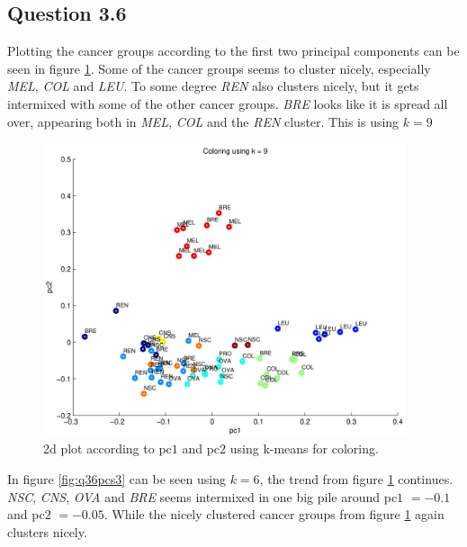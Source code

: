\subsection*{Question 3.6}

Plotting the cancer groups according to the first two principal
components can be seen in figure \ref{fig:q36pcs2}. Some of the cancer
groups seems to cluster nicely, especially \emph{MEL}, \emph{COL} and
\emph{LEU}. To some degree \emph{REN} also clusters nicely, but it
gets intermixed with some of the other cancer groups. \emph{BRE} looks
like it is spread all over, appearing both in \emph{MEL}, \emph{COL}
and the \emph{REN} cluster. This is using $k = 9$

\begin{figure}[!htbp]
  \centering \includegraphics[width=0.95\textwidth]{./images/q36pcs2}
  \caption{2d plot according to pc$1$ and pc$2$ using k-means for
    coloring.}
  \label{fig:q36pcs2}
\end{figure}

\newpage

In figure \ref{fig:q36pcs3} can be seen using $k = 6$, the trend from
figure \ref{fig:q36pcs2} continues. \emph{NSC}, \emph{CNS}, \emph{OVA}
and \emph{BRE} seems intermixed in one big pile around pc$1$ $= -0.1$
and pc$2$ $= -0.05$. While the nicely clustered cancer groups from
figure \ref{fig:q36pcs2} again clusters nicely.


